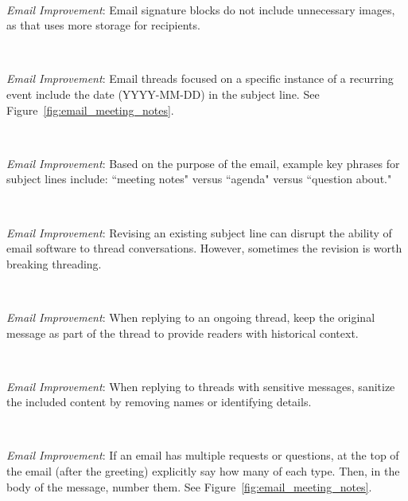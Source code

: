 \ \\
\begin{samepage}
\textit{Email Improvement}: Email signature blocks do not include unnecessary images, as that uses more storage for recipients.
\end{samepage}

\ \\
\begin{samepage}
\textit{Email Improvement}: Email threads focused on a specific instance of a recurring event include the date (YYYY-MM-DD) in the subject line. See Figure~\ref{fig:email_meeting_notes}.
\end{samepage}

\ \\
\begin{samepage}
\textit{Email Improvement}: Based on the purpose of the email, example key phrases for subject lines include: ``meeting notes" versus ``agenda" versus ``question about."
\end{samepage}

\ \\
\begin{samepage}
\textit{Email Improvement}: Revising an existing subject line can disrupt the ability of email software to thread conversations. However, sometimes the revision is worth breaking threading.
\end{samepage}

\ \\
\begin{samepage}
\textit{Email Improvement}: When replying to an ongoing thread, keep the original message as part of the thread to provide readers with historical context.
\end{samepage}

\ \\
\begin{samepage}
\textit{Email Improvement}: When replying to threads with sensitive messages, sanitize the included content by removing names or identifying details.
\end{samepage}

\ \\
\begin{samepage}
\textit{Email Improvement}: If an email has multiple requests or questions, at the top of the email (after the greeting) explicitly say how many of each type. Then, in the body of the message, number them. See Figure~\ref{fig:email_meeting_notes}.
\end{samepage}

